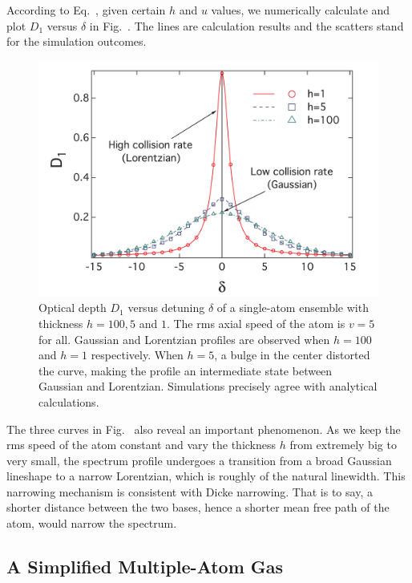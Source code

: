 According to Eq.~, given certain $h$ and $u$ values, we numerically calculate and plot $D_1$ versus $\delta$ in  Fig.~. The lines are calculation results and the scatters stand for the simulation outcomes.
\begin{figure}[h!]
\begin{center}
\includegraphics[width=\textwidth]{single_atom.pdf}
\end{center}
\caption{Optical depth $D_1$ versus detuning $\delta$ of a single-atom ensemble with thickness $h=100, 5$ and $1$. The rms axial speed of the atom is $v=5$ for all. Gaussian and Lorentzian profiles are observed when $h=100$ and $h=1$ respectively. When $h=5$, a bulge in the center distorted the curve, making the profile an intermediate state between Gaussian and Lorentzian. Simulations precisely agree with analytical calculations.}
\label{SINGLESPECTRUM}
\end{figure}

The three curves in  Fig.~ also reveal an important phenomenon. As we keep the rms speed of the atom constant and vary the thickness $h$ from extremely big to very small, the spectrum profile undergoes a transition from a broad Gaussian lineshape to a narrow Lorentzian, which is roughly of the natural linewidth.  This narrowing mechanism is consistent with Dicke narrowing. That is to say,  a shorter distance between the two bases, hence a shorter mean free path of the atom, would narrow the spectrum.

\subsection{A Simplified Multiple-Atom Gas}

